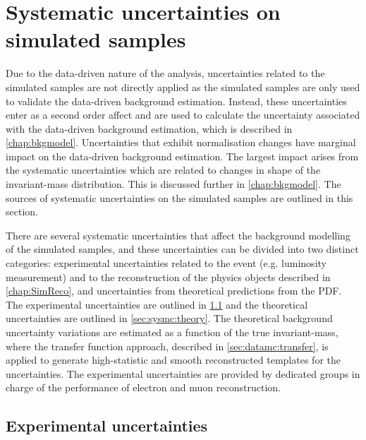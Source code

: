 \chapter{Systematic uncertainties on simulated samples}\label{chap:sysmc}

Due to the data-driven nature of the analysis, uncertainties related to the simulated samples are not directly applied as the simulated samples are only used to validate the data-driven background estimation. Instead, these uncertainties enter as a second order affect and are used to calculate the uncertainty associated with the data-driven background estimation, which is described in \cref{chap:bkgmodel}. Uncertainties that exhibit normalisation changes have marginal impact on the data-driven background estimation. The largest impact arises from the systematic uncertainties which are related to changes in shape of the invariant-mass distribution. This is discussed further in \cref{chap:bkgmodel}. The sources of systematic uncertainties on the simulated samples are outlined in this section. 

There are several systematic uncertainties that affect the background modelling of the simulated samples, and these uncertainties can be divided into two distinct categories: experimental uncertainties related to the event (e.g. luminosity measurement) and to the reconstruction of the physics objects described in \cref{chap:SimReco}, and uncertainties from theoretical predictions from the PDF. The experimental uncertainties are outlined in \cref{sec:sysmc:exp} and the theoretical uncertainties are outlined in \cref{sec:sysmc:theory}. The theoretical background uncertainty variations are estimated as a function of the true invariant-mass, where the transfer function approach, described in \cref{sec:datamc:transfer}, is applied to generate high-statistic and smooth reconstructed templates for the uncertainties. The experimental uncertainties are provided by dedicated groups in charge of the performance of electron and muon reconstruction.

\section{Experimental uncertainties}\label{sec:sysmc:exp}

